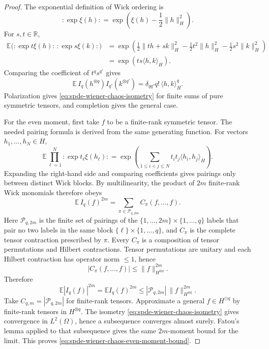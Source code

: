 \begin{proof}
The exponential definition of Wick ordering is
\[
  :\!\exp \xi(h)\!:
  =
  \exp\left(\xi(h)-\frac12\|h\|_H^2\right).
\]
For \(s,t\in\mathbb R\),
\[
\begin{aligned}
  \mathbb E\bigl(:\!\exp t\xi(h)\!:\,:\!\exp s\xi(k)\!:\bigr)
  &=
  \exp\left(
    \frac12\|th+sk\|_H^2
    -\frac12t^2\|h\|_H^2
    -\frac12s^2\|k\|_H^2
  \right)  \\
  &=
  \exp(ts\langle h,k\rangle_H).
\end{aligned}
\]
Comparing the coefficient of \(t^q s^{q'}\) gives
\[
  \mathbb E\,I_q(h^{\otimes q})I_{q'}(k^{\otimes q'})
  =
  \delta_{q q'}q!\,\langle h,k\rangle_H^q .
\]
Polarization gives \eqref{eq:spde-wiener-chaos-isometry} for finite sums of
pure symmetric tensors, and completion gives the general case.

For the even moment, first take \(f\) to be a finite-rank symmetric tensor.
The needed pairing formula is derived from the same generating function.  For
vectors \(h_1,\ldots,h_N\in H\),
\[
  \mathbb E\prod_{\ell=1}^N :\!\exp t_\ell\xi(h_\ell)\!:
  =
  \exp\left(
    \sum_{1\leq i<j\leq N}
    t_it_j\langle h_i,h_j\rangle_H
  \right).
\]
Expanding the right-hand side and comparing coefficients gives pairings
only between distinct Wick blocks.  By multilinearity, the product of
\(2m\) finite-rank Wick monomials therefore obeys
\[
  \mathbb E\,I_q(f)^{2m}
  =
  \sum_{\pi\in\mathcal P_{q,2m}} C_\pi(f,\ldots,f).
\]
Here \(\mathcal P_{q,2m}\) is the finite set of pairings of the
\(\{1,\ldots,2m\}\times\{1,\ldots,q\}\) labels that pair no two labels in
the same block \(\{\ell\}\times\{1,\ldots,q\}\), and \(C_\pi\) is the
complete tensor contraction prescribed by \(\pi\).  Every \(C_\pi\) is a
composition of tensor permutations and Hilbert contractions.  Tensor
permutations are unitary and each Hilbert contraction has operator norm
\(\leq1\), hence
\[
  |C_\pi(f,\ldots,f)|
  \leq
  \|f\|_{H^{\otimes q}}^{2m}.
\]
Therefore
\[
  \mathbb E|I_q(f)|^{2m}
  =
  \mathbb E I_q(f)^{2m}
  \leq
  |\mathcal P_{q,2m}|\,
  \|f\|_{H^{\otimes q}}^{2m}.
\]
Take \(C_{q,m}=|\mathcal P_{q,2m}|\) for finite-rank tensors.  Approximate
a general \(f\in H^{\odot q}\) by finite-rank tensors in \(H^{\otimes q}\).
The isometry \eqref{eq:spde-wiener-chaos-isometry} gives convergence in
\(L^2(\Omega)\), hence a subsequence converges almost surely.  Fatou's lemma
applied to that subsequence gives the same \(2m\)-moment bound for the
limit.  This proves \eqref{eq:spde-wiener-chaos-even-moment-bound}.
\end{proof}

